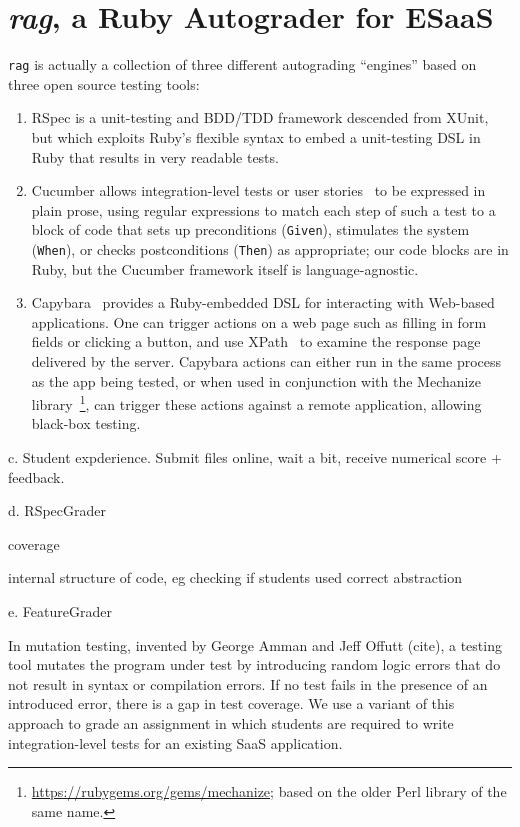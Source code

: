 \section{\emph{rag}, a Ruby Autograder for ESaaS}

\texttt{rag} is actually a collection of three different autograding
``engines'' based on three open source testing
tools:
\begin{enumerate}

\item RSpec is a unit-testing and
BDD/TDD framework descended from XUnit, but which exploits Ruby's
flexible syntax to embed a unit-testing DSL in Ruby that results in very
readable tests.  

\item Cucumber allows
integration-level tests or user stories~\cite{user-stories} to be
expressed in plain prose, using regular expressions to match each step
of such a test to a block of code that sets up preconditions (\texttt{Given}), stimulates
the system (\texttt{When}), or checks postconditions (\texttt{Then}) as
appropriate; our code blocks are in Ruby, but the Cucumber framework
itself is language-agnostic.  

\item Capybara~
provides a Ruby-embedded DSL for interacting with Web-based
applications.
One can trigger actions on a web page such as filling in form fields
or clicking a button, and use XPath~\cite{xpath} to examine the
response page delivered by the server.
Capybara actions can either run in the same process as the app being
tested, or when used in conjunction with the Mechanize
library~\footnote{\url{https://rubygems.org/gems/mechanize}; based on
  the older Perl library of the same name.}, can trigger these actions
against a remote application, allowing black-box testing.

\end{enumerate}




c.	Student expderience. Submit files online, wait a bit, receive numerical score + feedback.

d.	RSpecGrader

coverage

internal structure of code, eg checking if students used correct
abstraction 



e.	FeatureGrader


In mutation testing, invented by George Amman and Jeff Offutt (cite), a
testing tool mutates the program under test by introducing random logic
errors that do not result in syntax or compilation errors.  If no test fails
in the presence of an introduced error, there is a gap in test
coverage.  We use a variant of this approach to grade an
assignment in which students are required to write integration-level
tests for an existing SaaS application.

